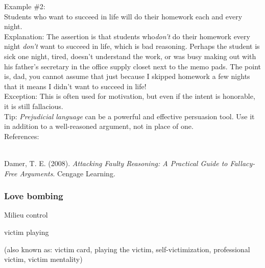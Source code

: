 \documentclass[a4paper,12pt,single,pdftex]{scrartcl}
\begin{document}
    
      Example \#2:
    \\

    
      Students who want to succeed in life will do their homework each and every night.
    \\

    
      Explanation: The assertion is that students who{\it  don’t}  do their homework every night {\it don’t} want to succeed in life, which is bad reasoning.  Perhaps the student is sick one night, tired, doesn’t understand the work, or was busy making out with his father’s secretary in the office supply closet next to the memo pads.  The point is, dad, you cannot assume that just because I skipped homework a few nights that it means I didn’t want to succeed in life!
    \\

    
      Exception: This is often used for motivation, but even if the intent is honorable, it is still fallacious.
    \\

    
      Tip: {\em Prejudicial language} can be a powerful and effective persuasion tool. Use it in addition to a well-reasoned argument, not in place of one.
    \\

    References:

    
      
        
      \\

      
        
          Damer, T. E. (2008). {\it Attacking Faulty Reasoning: A Practical Guide to Fallacy-Free Arguments}. Cengage Learning.
        
      
    
  \subsubsection{Love bombing}


Milieu control

 victim playing
    
      (also known as: victim card, playing the victim, self-victimization, professional victim, victim mentality)
    \\

  
\end{document}
